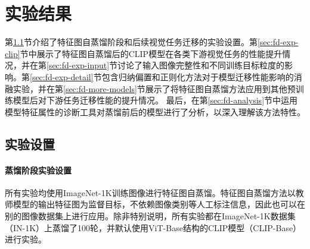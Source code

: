 \section{实验结果}
\label{sec:fd-result}

第\ref{sec:fd-exp-setting}节介绍了特征图自蒸馏阶段和后续视觉任务迁移的实验设置。第\ref{sec:fd-exp-clip}节中展示了特征图自蒸馏后的CLIP模型在各类下游视觉任务的性能提升情况，并在第\ref{sec:fd-exp-input}节讨论了输入图像完整性和不同训练目标粒度的影响。第\ref{sec:fd-exp-detail}节包含归纳偏置和正则化方法对于模型迁移性能影响的消融实验，并在第\ref{sec:fd-more-models}节展示了将特征图自蒸馏方法应用到其他预训练模型后对下游任务迁移性能的提升情况。
最后，在第\ref{sec:fd-analysis}节中运用模型特征属性的诊断工具对蒸馏前后的模型进行了分析，以深入理解该方法特性。

\subsection{实验设置}
\label{sec:fd-exp-setting}
\paragraph{蒸馏阶段实验设置} 所有实验均使用ImageNet-1K\cite{deng2009imagenet}训练图像进行特征图自蒸馏。特征图自蒸馏方法以教师模型的输出特征图为监督目标，不依赖图像类别等人工标注信息，因此也可以在别的图像数据集上进行应用。除非特别说明，所有实验都在ImageNet-1K数据集（IN-1K）上蒸馏了100轮，并默认使用ViT-Base\cite{dosovitskiy2020vit}结构的CLIP模型（CLIP-Base）进行实验。%
